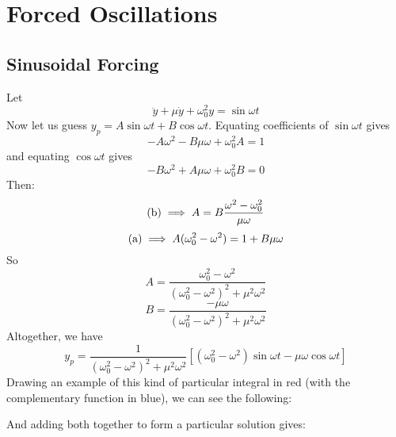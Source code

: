 \documentclass{article}
\begin{document}
\section{Forced Oscillations}
\subsection{Sinusoidal Forcing}
Let
\[ \ddot y + \mu \dot y + \omega_0^2 y = \sin \omega t \]
Now let us guess $y_p = A\sin \omega t + B\cos \omega t$. Equating coefficients of $\sin\omega t$ gives
\[ -A\omega^2 - B\mu\omega + \omega_0^2A = 1 \tag{a} \]
and equating $\cos\omega t$ gives
\[ -B\omega^2 + A\mu\omega + \omega_0^2B = 0 \tag{b} \]
Then:
\[ (\text b) \implies A = B \frac{\omega^2 - \omega_0^2}{\mu\omega} \]
\[ (\text a) \implies A(\omega_0^2 - \omega^2) = 1 + B\mu\omega \]
So
\[ A = \frac{\omega_0^2 - \omega^2}{(\omega_0^2 - \omega^2)^2 + \mu^2\omega^2} \]
\[ B = \frac{-\mu\omega}{(\omega_0^2 - \omega^2)^2 + \mu^2\omega^2} \]
Altogether, we have
\[ y_p = \frac{1}{(\omega_0^2 - \omega^2)^2 + \mu^2\omega^2}\left[ (\omega_0^2 - \omega^2)\sin\omega t - \mu \omega \cos \omega t \right] \]
Drawing an example of this kind of particular integral in red (with the complementary function in blue), we can see the following:\medskip


\noindent And adding both together to form a particular solution gives:\medskip

\end{document}
